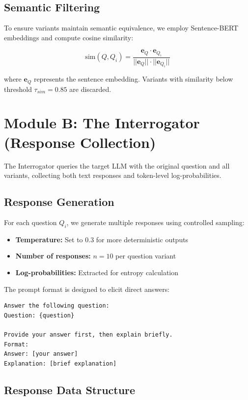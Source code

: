 \subsection{Semantic Filtering}

To ensure variants maintain semantic equivalence, we employ Sentence-BERT embeddings and compute cosine similarity:

\begin{equation}
    \text{sim}(Q, Q_i) = \frac{\mathbf{e}_Q \cdot \mathbf{e}_{Q_i}}{||\mathbf{e}_Q|| \cdot ||\mathbf{e}_{Q_i}||}
\end{equation}

where $\mathbf{e}_Q$ represents the sentence embedding. Variants with similarity below threshold $\tau_{sim} = 0.85$ are discarded.

\section{Module B: The Interrogator (Response Collection)}

The Interrogator queries the target LLM with the original question and all variants, collecting both text responses and token-level log-probabilities.

\subsection{Response Generation}

For each question $Q_i$, we generate multiple responses using controlled sampling:

\begin{itemize}
    \item \textbf{Temperature:} Set to 0.3 for more deterministic outputs
    \item \textbf{Number of responses:} $n = 10$ per question variant
    \item \textbf{Log-probabilities:} Extracted for entropy calculation
\end{itemize}

The prompt format is designed to elicit direct answers:

\begin{verbatim}
Answer the following question:
Question: {question}

Provide your answer first, then explain briefly.
Format:
Answer: [your answer]
Explanation: [brief explanation]
\end{verbatim}

\subsection{Response Data Structure}

